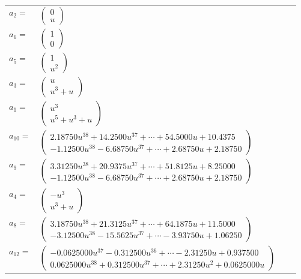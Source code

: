 \documentclass[1p]{elsarticle_modified}
\theoremstyle{definition}
\begin{document}
\begin{tabular}{m{7pt} m{180pt} m{7pt} m{180pt} }
\flushright $a_{2}=$&$\begin{pmatrix}0\\u\end{pmatrix}$ \\
\flushright $a_{6}=$&$\begin{pmatrix}1\\0\end{pmatrix}$ \\
\flushright $a_{5}=$&$\begin{pmatrix}1\\u^2\end{pmatrix}$ \\
\flushright $a_{3}=$&$\begin{pmatrix}u\\u^3+u\end{pmatrix}$ \\
\flushright $a_{1}=$&$\begin{pmatrix}u^3\\u^5+u^3+u\end{pmatrix}$ \\
\flushright $a_{10}=$&$\begin{pmatrix}2.18750 u^{38}+14.2500 u^{37}+\cdots+54.5000 u+10.4375\\-1.12500 u^{38}-6.68750 u^{37}+\cdots+2.68750 u+2.18750\end{pmatrix}$ \\
\flushright $a_{9}=$&$\begin{pmatrix}3.31250 u^{38}+20.9375 u^{37}+\cdots+51.8125 u+8.25000\\-1.12500 u^{38}-6.68750 u^{37}+\cdots+2.68750 u+2.18750\end{pmatrix}$ \\
\flushright $a_{4}=$&$\begin{pmatrix}- u^3\\u^3+u\end{pmatrix}$ \\
\flushright $a_{8}=$&$\begin{pmatrix}3.18750 u^{38}+21.3125 u^{37}+\cdots+64.1875 u+11.5000\\-3.12500 u^{38}-15.5625 u^{37}+\cdots-3.93750 u+1.06250\end{pmatrix}$ \\
\flushright $a_{12}=$&$\begin{pmatrix}-0.0625000 u^{37}-0.312500 u^{36}+\cdots-2.31250 u+0.937500\\0.0625000 u^{38}+0.312500 u^{37}+\cdots+2.31250 u^{2}+0.0625000 u\end{pmatrix}$ \\

\end{tabular}
\end{document}
